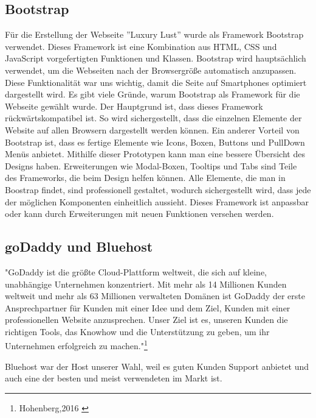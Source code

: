 \subsection{Bootstrap}
Für die Erstellung der Webseite ''Luxury Lust'' wurde als Framework Bootstrap verwendet. Dieses Framework ist eine Kombination aus HTML, CSS und JavaScript vorgefertigten Funktionen und Klassen. Bootstrap wird haupts\"achlich verwendet, um die Webseiten nach der Browsergr\"oße automatisch anzupassen. Diese Funktionalität war uns wichtig, damit die Seite auf Smartphones optimiert dargestellt wird.
Es gibt viele Gr\"unde, warum Bootstrap als Framework für die Webseite gew\"ahlt wurde. Der Hauptgrund ist, dass dieses Framework r\"uckw\"artskompatibel ist. So wird sichergestellt, dass die einzelnen Elemente der Website auf allen Browsern dargestellt werden k\"onnen. Ein anderer Vorteil von Bootstrap ist, dass es fertige Elemente wie Icons, Boxen, Buttons und PullDown Men\"us anbietet. Mithilfe dieser Prototypen kann man eine bessere \"Ubersicht des Designs haben. Erweiterungen wie Modal-Boxen, Tooltips und Tabs sind Teile des Frameworks, die beim Design helfen k\"onnen. Alle Elemente, die man in Boostrap findet, sind professionell gestaltet, wodurch sichergestellt wird, dass jede der m\"oglichen Komponenten einheitlich aussieht.
Dieses Framework ist anpassbar oder kann durch Erweiterungen mit neuen Funktionen versehen werden.

\subsection{goDaddy und Bluehost}
"GoDaddy ist die größte Cloud-Plattform weltweit, die sich auf kleine, unabhängige Unternehmen konzentriert. Mit mehr als 14 Millionen Kunden weltweit und mehr als 63 Millionen verwalteten Domänen ist GoDaddy der erste Ansprechpartner für Kunden mit einer Idee und dem Ziel, Kunden mit einer professionellen Website anzusprechen. Unser Ziel ist es, unseren Kunden die richtigen Tools, das Knowhow und die Unterstützung zu geben, um ihr Unternehmen erfolgreich zu machen."\footnote{Hohenberg,2016 \cite{Hohenberg2016}}

Bluehost war der Host unserer Wahl, weil es guten Kunden Support anbietet und auch eine der besten und meist verwendeten im Markt ist.


